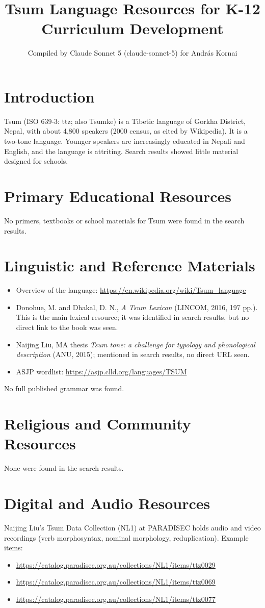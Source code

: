 \documentclass[12pt]{article}
\title{Tsum Language Resources for K-12 Curriculum Development}
\author{Compiled by Claude Sonnet 5 (claude-sonnet-5) for Andr\'as Kornai}
\date{}
\begin{document}
\maketitle

\section{Introduction}
Tsum (ISO 639-3: ttz; also Tsumke) is a Tibetic language of Gorkha District, Nepal, with about 4,800 speakers (2000 census, as cited by Wikipedia). It is a two-tone language. Younger speakers are increasingly educated in Nepali and English, and the language is attriting. Search results showed little material designed for schools.

\section{Primary Educational Resources}
No primers, textbooks or school materials for Tsum were found in the search results.

\section{Linguistic and Reference Materials}
\begin{itemize}
\item Overview of the language: \url{https://en.wikipedia.org/wiki/Tsum_language}
\item Donohue, M. and Dhakal, D. N., \emph{A Tsum Lexicon} (LINCOM, 2016, 197 pp.). This is the main lexical resource; it was identified in search results, but no direct link to the book was seen.
\item Naijing Liu, MA thesis \emph{Tsum tone: a challenge for typology and phonological description} (ANU, 2015); mentioned in search results, no direct URL seen.
\item ASJP wordlist: \url{https://asjp.clld.org/languages/TSUM}
\end{itemize}
No full published grammar was found.

\section{Religious and Community Resources}
None were found in the search results.

\section{Digital and Audio Resources}
Naijing Liu's Tsum Data Collection (NL1) at PARADISEC holds audio and video recordings (verb morphosyntax, nominal morphology, reduplication). Example items:
\begin{itemize}
\item \url{https://catalog.paradisec.org.au/collections/NL1/items/ttz0029}
\item \url{https://catalog.paradisec.org.au/collections/NL1/items/ttz0069}
\item \url{https://catalog.paradisec.org.au/collections/NL1/items/ttz0077}
\end{itemize}
\end{document}
